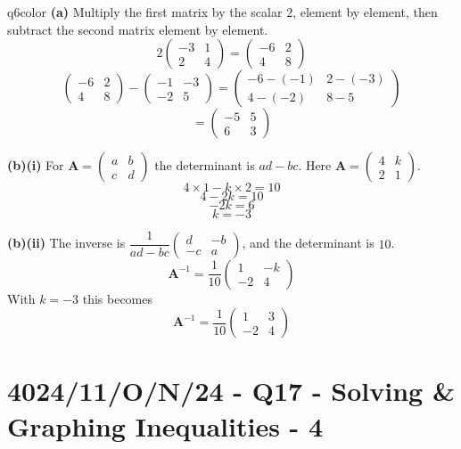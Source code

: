 \documentclass[11pt,a4paper]{article}
\newcommand{\examq}[4]{\section[#1 - Q#2]{#1 - Q#2 - #3 - #4}}
\begin{document}
\begin{ansbox}{q6color}
\textbf{(a)} Multiply the first matrix by the scalar $2$, element by element, then subtract the second matrix element by element.
\[ 2\begin{pmatrix} -3 & 1 \\ 2 & 4 \end{pmatrix} = \begin{pmatrix} -6 & 2 \\ 4 & 8 \end{pmatrix} \]
\[ \begin{pmatrix} -6 & 2 \\ 4 & 8 \end{pmatrix} - \begin{pmatrix} -1 & -3 \\ -2 & 5 \end{pmatrix} = \begin{pmatrix} -6 - (-1) & 2 - (-3) \\ 4 - (-2) & 8 - 5 \end{pmatrix} \]
\[ = \begin{pmatrix} -5 & 5 \\ 6 & 3 \end{pmatrix} \]

\textbf{(b)(i)} For $\mathbf{A} = \begin{pmatrix} a & b \\ c & d \end{pmatrix}$ the determinant is $ad - bc$. Here $\mathbf{A} = \begin{pmatrix} 4 & k \\ 2 & 1 \end{pmatrix}$.
\[ 4 \times 1 - k \times 2 = 10 \]
\[ 4 - 2k = 10 \]
\[ -2k = 6 \]
\[ k = -3 \]

\textbf{(b)(ii)} The inverse is $\dfrac{1}{ad - bc}\begin{pmatrix} d & -b \\ -c & a \end{pmatrix}$, and the determinant is $10$.
\[ \mathbf{A}^{-1} = \frac{1}{10}\begin{pmatrix} 1 & -k \\ -2 & 4 \end{pmatrix} \]
With $k = -3$ this becomes
\[ \mathbf{A}^{-1} = \frac{1}{10}\begin{pmatrix} 1 & 3 \\ -2 & 4 \end{pmatrix} \]
\end{ansbox}

\examq{4024/11/O/N/24}{17}{Solving \& Graphing Inequalities}{4}
\end{document}

